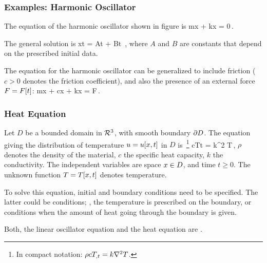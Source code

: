 \subsubsection{Examples: Harmonic Oscillator} The equation of the harmonic oscillator shown in figure is
\beq
m\ddt x + kx = 0\,.
\eeq

The general solution is
\beq
x\vat t = A\cos{}t + B\sin{}t \,,
\eeq
where $A$ and $B$ are constants that depend on the prescribed initial data.

The equation for the harmonic oscillator can be generalized to include friction ($c > 0$ denotes the friction coefficient), and also the presence of an external force $F = F\!\left[{t}\right]$:
\beq
m\ddt x + c\dt x + kx = F\,.
\eeq


\subsubsection{Heat Equation}
Let $D$ be a bounded domain in $\mathcal{R}^{3}$, with smooth boundary $\partial D$. The equation giving the distribution of temperature $u = u\!\left[{x, t}\right]$ in $D$ is~\footnote{In compact notation: $\rho c{T}_{,{t}} = k\nabla^2 T$.}
\beq
\rho c\xpd Tt = k\gder^2 T\,,
\eeq
$\rho$ denotes the density of the material, $c$ the specific heat capacity, $k$ the conductivity. The independent variables are space $x\in D$, and time $t\geq 0$. The unknown function $T = T\!\left[{x, t}\right]$ denotes temperature.

To solve this equation, initial and boundary conditions need to be specified. The latter could be  conditions; \ie, the temperature is prescribed on the boundary, or  conditions when the amount of heat going through the boundary is given.

Both, the linear oscillator equation and the heat equation are . 

